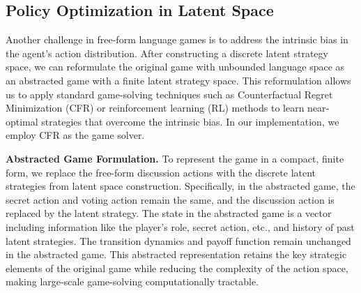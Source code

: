 

\subsection{Policy Optimization in Latent Space}

Another challenge in free-form language games is to address the intrinsic bias in the agent's action distribution. After constructing a discrete latent strategy space, we can reformulate the original game with unbounded language space as an abstracted game with a finite latent strategy space. This reformulation allows us to apply standard game-solving techniques such as Counterfactual Regret Minimization (CFR) or reinforcement learning (RL) methods to learn near-optimal strategies that overcome the intrinsic bias. In our implementation, we employ CFR as the game solver.

\textbf{Abstracted Game Formulation.} 
To represent the game in a compact, finite form, we replace the free-form discussion actions with the discrete latent strategies from latent space construction. Specifically, in the abstracted game, the secret action and voting action remain the same, and the discussion action is replaced by the latent strategy. The state in the abstracted game is a vector including information like the player's role, secret action, etc., and history of past latent strategies. The transition dynamics and payoff function remain unchanged in the abstracted game. This abstracted representation retains the key strategic elements of the original game while reducing the complexity of the action space, making large-scale game-solving computationally tractable.

